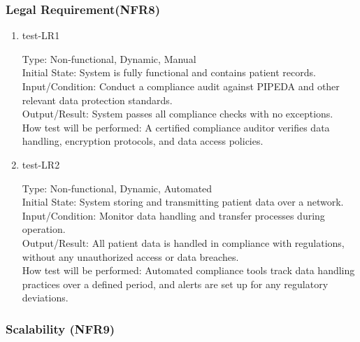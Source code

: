 \documentclass[12pt, titlepage]{article}
\begin{document}
\subsubsection{Legal Requirement(NFR8)} \label{section:4.2.8}

\begin{enumerate}
    \item{test-LR1\\} \label{test-LR1}
    
    Type: Non-functional, Dynamic, Manual\\
    
    Initial State: System is fully functional and contains patient records.\\
    
    Input/Condition: Conduct a compliance audit against PIPEDA and other relevant data protection standards.\\
    
    Output/Result: System passes all compliance checks with no exceptions.\\
    
    How test will be performed: A certified compliance auditor verifies data handling, encryption protocols, and data access policies.

    \item{test-LR2\\} \label{test-LR2}
    
    Type: Non-functional, Dynamic, Automated\\
    
    Initial State: System storing and transmitting patient data over a network.\\
    
    Input/Condition: Monitor data handling and transfer processes during operation.\\
    
    Output/Result: All patient data is handled in compliance with regulations, without any unauthorized access or data breaches.\\
    
    How test will be performed: Automated compliance tools track data handling practices over a defined period, and alerts are set up for any regulatory deviations.
\end{enumerate}

\subsubsection{Scalability (NFR9)} \label{section:4.2.9}
\end{document}
